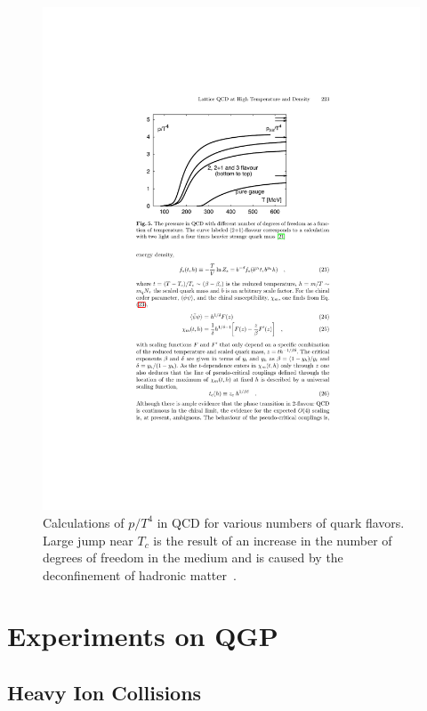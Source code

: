 \begin{figure}[htbp]
\begin{center}
\includegraphics[scale=1.0]{Plots/Intro/pressure.pdf}
\end{center}
\caption[$p/T^4$ Calculations]{Calculations of $p/T^4$ in QCD for various numbers of quark flavors. Large jump near $T_c$ is the result of an increase in the number of degrees of freedom in the medium and is caused by the deconfinement of hadronic matter~\cite{hitempQCD}.}
\label{fig:pressure}
\end{figure}

\section{Experiments on QGP}

\subsection{Heavy Ion Collisions}

